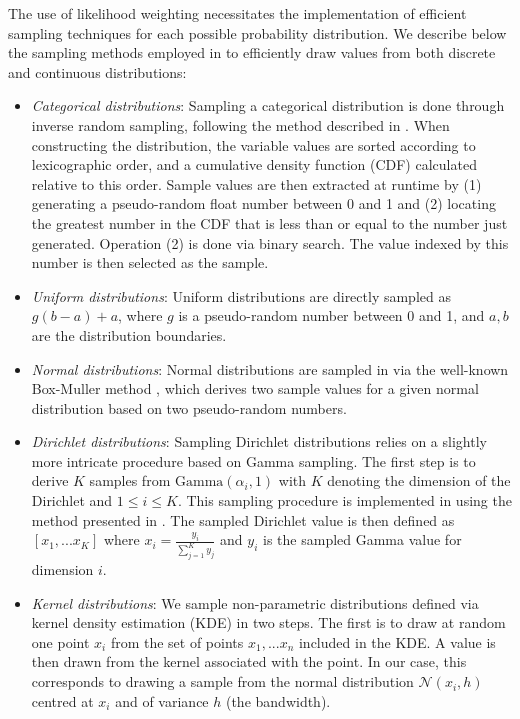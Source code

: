 The use of likelihood weighting necessitates the implementation of efficient sampling techniques for each possible probability distribution.  We describe below the sampling methods employed in \opendial{} to efficiently draw values from both discrete and continuous distributions:
\begin{itemize}
\item \textit{Categorical distributions}:  Sampling a categorical distribution is done through inverse random sampling, following the method described in \citet[p.~489]{Koller+Friedman:09}. When constructing the distribution, the variable values are sorted according to lexicographic order, and a cumulative density function (CDF) calculated relative to this order.  Sample values are then extracted at runtime by (1) generating a pseudo-random float number between 0 and 1 and (2) locating the greatest number in the CDF that is less than or equal to the number just generated.  Operation (2) is done via binary search. The value indexed by this number is then selected as the sample.
\item \textit{Uniform distributions}:  Uniform distributions are directly sampled as $g (b-a) + a$, where $g$ is a pseudo-random number between 0 and 1, and $a,b$ are the distribution boundaries.

\item \textit{Normal distributions}:  Normal distributions are sampled in \opendial{} via the well-known Box-Muller method \citep{rBOX58a}, which derives two sample values for a given normal distribution based on two pseudo-random numbers.

\item \textit{Dirichlet distributions}:  Sampling Dirichlet distributions relies on a slightly more intricate procedure based on Gamma sampling.   The first step is to derive $K$ samples from $\mathrm{Gamma} (\alpha_i, 1)$ with $K$ denoting the dimension of the Dirichlet and $1 \leq i \leq K$.  This sampling procedure is implemented in \opendial{} using the method presented in \cite{cheng1979}.  The sampled Dirichlet value is then defined as $[x_1,...x_K]$ where $x_i = \frac{y_i}{\sum_{j=1}^K y_j}$ and $y_i$ is the sampled Gamma value for dimension $i$.
\item \textit{Kernel distributions}:  We sample non-parametric distributions defined via kernel density estimation (KDE) in two steps. The first is to draw at random one point $x_i$ from the set of points $x_1,...x_n$ included in the KDE. A value is then drawn from the kernel associated with the point. In our case, this corresponds to drawing a sample from the normal distribution $\mathcal{N}(x_i,h)$ centred at $x_i$ and of variance $h$ (the bandwidth). 
\end{itemize}

